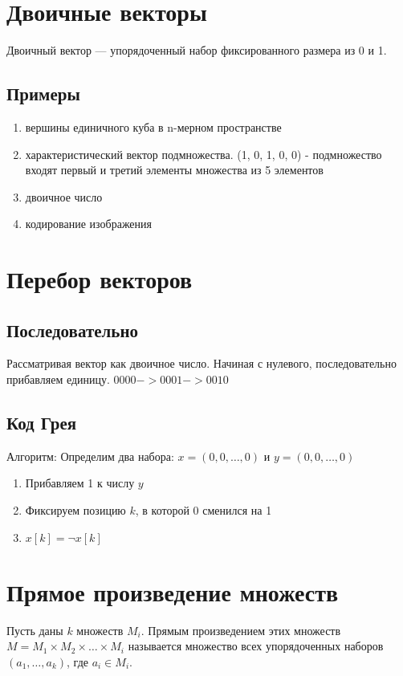 \documentclass[main]{subfiles}
\begin{document}
\section{Двоичные векторы}

\begin{definition}
    Двоичный вектор --- упорядоченный набор фиксированного размера из 0 и 1.
\end{definition}

\subsection{Примеры}
\begin{enumerate}
    \item вершины единичного куба в n-мерном пространстве 
    \item характеристический вектор подмножества. (1, 0, 1, 0, 0) - подмножество 
входят первый и третий элементы множества из 5 элементов
    \item двоичное число
    \item кодирование изображения
\end{enumerate}

\section{Перебор векторов}
\subsection{Последовательно}
Рассматривая вектор как двоичное число. Начиная с нулевого, последовательно 
прибавляем единицу. $0000 -> 0001 -> 0010$

\subsection{Код Грея}
Алгоритм: Определим два набора: $x = \left(0, 0, \ldots, 0\right)$ и 
$y = \left(0, 0, \ldots, 0\right)$
\begin{enumerate}
    \item Прибавляем 1 к числу $y$
    \item Фиксируем позицию $k$, в которой 0 сменился на 1
    \item $x[k] = \lnot x[k]$
\end{enumerate}

\section{Прямое произведение множеств}
\begin{definition}
    Пусть даны $k$ множеств $M_i$. Прямым произведением этих множеств 
    $M = M_1 \times M_2 \times \ldots \times M_i$ называется множество всех 
    упорядоченных наборов $(a_1, \ldots, a_k)$, где $a_i \in M_i$.
\end{definition}
\end{document}
